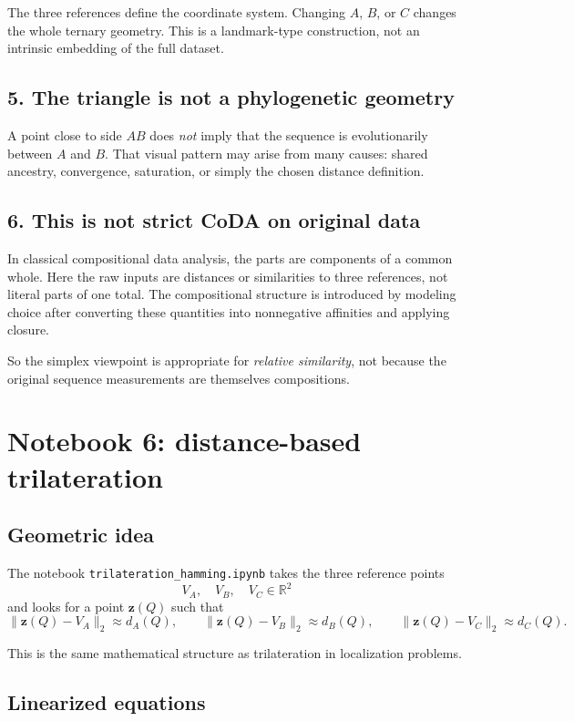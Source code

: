 \documentclass[11pt,a4paper]{article}
\begin{document}
The three references define the coordinate system. Changing $A$, $B$, or $C$ changes the whole ternary geometry. This is a landmark-type construction, not an intrinsic embedding of the full dataset.

\subsection{5. The triangle is not a phylogenetic geometry}

A point close to side $AB$ does \emph{not} imply that the sequence is evolutionarily between $A$ and $B$. That visual pattern may arise from many causes: shared ancestry, convergence, saturation, or simply the chosen distance definition.

\subsection{6. This is not strict CoDA on original data}

In classical compositional data analysis, the parts are components of a common whole. Here the raw inputs are distances or similarities to three references, not literal parts of one total. The compositional structure is introduced by modeling choice after converting these quantities into nonnegative affinities and applying closure.

So the simplex viewpoint is appropriate for \emph{relative similarity}, not because the original sequence measurements are themselves compositions.

\section{Notebook 6: distance-based trilateration}

\subsection{Geometric idea}

The notebook \texttt{trilateration\_hamming.ipynb} takes the three reference points
\[
V_A,\quad V_B,\quad V_C\in\mathbb{R}^2
\]
and looks for a point $\bm{z}(Q)$ such that
\[
\|\bm{z}(Q)-V_A\|_2\approx d_A(Q),\qquad
\|\bm{z}(Q)-V_B\|_2\approx d_B(Q),\qquad
\|\bm{z}(Q)-V_C\|_2\approx d_C(Q).
\]

This is the same mathematical structure as trilateration in localization problems.

\subsection{Linearized equations}
\end{document}

